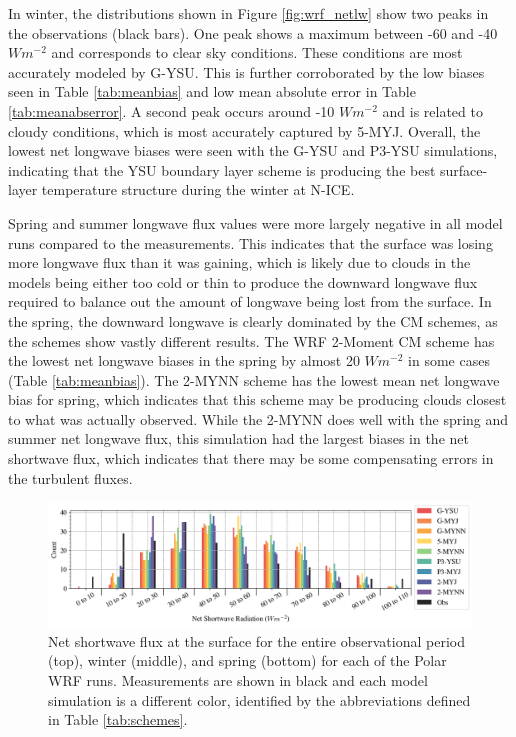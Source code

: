  In winter, the distributions shown in Figure \ref{fig:wrf_netlw} show two peaks in the observations (black bars). One peak shows a maximum between -60 and -40 $Wm^{-2}$ and corresponds to clear sky conditions. These conditions are most accurately modeled by G-YSU. This is further corroborated by the low biases seen in Table \ref{tab:meanbias} and low mean absolute error in Table \ref{tab:meanabserror}. A second peak occurs around -10 $Wm^{-2}$ and is related to cloudy conditions, which is most accurately captured by 5-MYJ. Overall, the lowest net longwave biases were seen with the G-YSU and P3-YSU simulations, indicating that the YSU boundary layer scheme is producing the best surface-layer temperature structure during the winter at N-ICE. 
 
 Spring and summer longwave flux values were more largely negative in all model runs compared to the measurements. This indicates that the surface was losing more longwave flux than it was gaining, which is likely due to clouds in the models being either too cold or thin to produce the downward longwave flux required to balance out the amount of longwave being lost from the surface. In the spring, the downward longwave is clearly dominated by the CM schemes, as the schemes show vastly different results. The WRF 2-Moment CM scheme has the lowest net longwave biases in the spring by almost 20 $Wm^{-2}$ in some cases (Table \ref{tab:meanbias}). The 2-MYNN scheme has the lowest mean net longwave bias for spring, which indicates that this scheme may be producing clouds closest to what was actually observed. While the 2-MYNN does well with the spring and summer net longwave flux, this simulation had the largest biases in the net shortwave flux, which indicates that there may be some compensating errors in the turbulent fluxes.

\begin{figure}[t]
    \centering
    \includegraphics[width=1\linewidth]{figures/chapter3/WRF_NetSW_Histo.png}
    \caption[Polar WRF simulated net shortwave flux histograms.]{Net shortwave flux at the surface for the entire observational period (top), winter (middle), and spring (bottom) for each of the Polar WRF runs. Measurements are shown in black and each model simulation is a different color, identified by the abbreviations defined in Table \ref{tab:schemes}.}
    \label{fig:wrf_netsw}
\end{figure}


